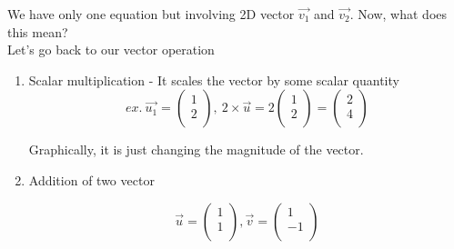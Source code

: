 \documentclass{article}
\begin{document}
We have only one equation but involving 2D vector \(\vec{v_1}\) and \(\vec{v_2}\). Now, what does this mean?\\
Let's go back to our vector operation\\
\begin{enumerate}
    \item Scalar multiplication - It scales the vector by some scalar quantity\\
\[  ex.~ \vec{u_1} = \begin{pmatrix}
                                1\\
                                2\\
                            \end{pmatrix}, ~ 2\times \vec{u}= 2\begin{pmatrix}
                                1\\
                                2\\
                             \end{pmatrix} = \begin{pmatrix}
                                2\\
                                4\\
                            \end{pmatrix}
\]



Graphically, it is just changing the magnitude of the vector.
    
    \item Addition of two vector 
    
\[
    \vec{u} = \begin{pmatrix}
                    1\\
                    1\\
               \end{pmatrix}, \vec{v} = 
               \begin{pmatrix}
                    1\\
                    -1\\
               \end{pmatrix}
\]    





\end{enumerate}
\end{document}
